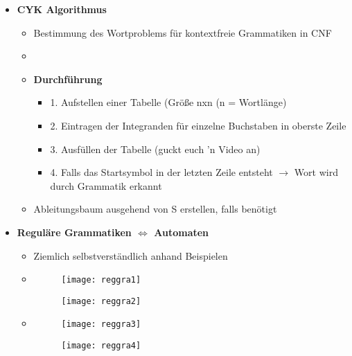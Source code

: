 \begin{itemize}
\item {\large \textbf{CYK Algorithmus}}
	\begin{itemize}
	\item Bestimmung des Wortproblems für kontextfreie Grammatiken in CNF
	\item[]
	\item \textbf{Durchführung}
		\begin{itemize}
		\item 1. Aufstellen einer Tabelle (Größe nxn (n = Wortlänge)
		\item 2. Eintragen der Integranden für einzelne Buchstaben in oberste Zeile
		\item 3. Ausfüllen der Tabelle (guckt euch 'n Video an)
		\item 4. Falls das Startsymbol in der letzten Zeile entsteht $\rightarrow$ Wort wird durch Grammatik erkannt
		\end{itemize}
	\item Ableitungsbaum ausgehend von S erstellen, falls benötigt
	\end{itemize}


\item {\large \textbf{Reguläre Grammatiken $\Leftrightarrow$ Automaten}}
	\begin{itemize}
	\item Ziemlich selbstverständlich anhand Beispielen
	\item[]
				\begin{minipage}{0.4\textwidth}
					\begin{figure}[H]
					\texttt{[image: reggra1]}
					\end{figure}
				\end{minipage}
				\begin{minipage}[t]{0.4\textwidth}
					\vspace{-1cm}
					\begin{figure}[H]
					\texttt{[image: reggra2]}
					\end{figure}
				\end{minipage}
	
	\item[]
				\begin{minipage}{0.4\textwidth}
					\begin{figure}[H]
					\texttt{[image: reggra3]}
					\end{figure}
				\end{minipage}
				\begin{minipage}[t]{0.4\textwidth}
					\vspace{-1.25cm}
					\begin{figure}[H]
					\texttt{[image: reggra4]}
					\end{figure}
				\end{minipage}
	\end{itemize}

\end{itemize}

